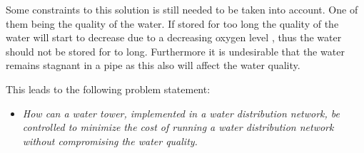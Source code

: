 Some constraints to this solution is still needed to be taken into account. One of them being the quality of the water. If stored for too long the quality of the water will start to decrease due to a decreasing oxygen level \cite{Lenntech,DO}, thus the water should not be stored for to long. Furthermore it is undesirable that the water remains stagnant in a pipe as this also will affect the water quality.

This leads to the following problem statement:
\begin{itemize}
\item \textit{How can a water tower, implemented in a water distribution network, be controlled to minimize the cost of running a water distribution network without compromising the water quality.}
\end{itemize} 









